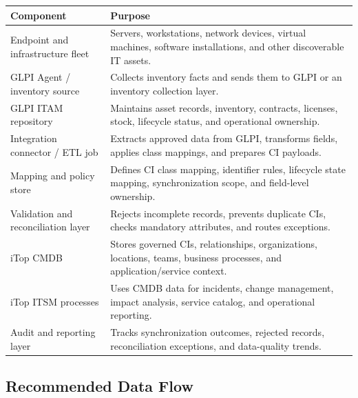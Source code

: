 \documentclass[11pt]{article}
\begin{document}
\begin{longtable}{>{\raggedright\arraybackslash}p{\dimexpr 0.24444\dimexpr\linewidth-4\tabcolsep\relax\relax}>{\raggedright\arraybackslash}p{\dimexpr 0.75556\dimexpr\linewidth-4\tabcolsep\relax\relax}}
\toprule
\rowcolor{LightBlue}\textbf{Component} & \textbf{Purpose} \\
\midrule
Endpoint and infrastructure fleet & Servers, workstations, network devices, virtual machines, software installations, and other discoverable IT assets. \\
GLPI Agent / inventory source & Collects inventory facts and sends them to GLPI or an inventory collection layer. \\
GLPI ITAM repository & Maintains asset records, inventory, contracts, licenses, stock, lifecycle status, and operational ownership. \\
Integration connector / ETL job & Extracts approved data from GLPI, transforms fields, applies class mappings, and prepares CI payloads. \\
Mapping and policy store & Defines CI class mapping, identifier rules, lifecycle state mapping, synchronization scope, and field-level ownership. \\
Validation and reconciliation layer & Rejects incomplete records, prevents duplicate CIs, checks mandatory attributes, and routes exceptions. \\
iTop CMDB & Stores governed CIs, relationships, organizations, locations, teams, business processes, and application/service context. \\
iTop ITSM processes & Uses CMDB data for incidents, change management, impact analysis, service catalog, and operational reporting. \\
Audit and reporting layer & Tracks synchronization outcomes, rejected records, reconciliation exceptions, and data-quality trends. \\
\bottomrule
\end{longtable}

\subsection{Recommended Data Flow}
\end{document}
